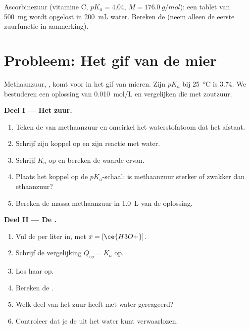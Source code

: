 \begin{exercise}[$\star\star\star$]\label{exo:g12:ka-and-pka:15}
Ascorbinezuur (vitamine C, $pK_a = 4.04$, $M = \qty{176.0}{g/mol}$): een
tablet van \qty{500}{mg} wordt opgelost in \qty{200}{mL} water. Bereken
de  (neem alleen de eerste zuurfunctie in aanmerking).
\end{exercise}

\section{Probleem: Het gif van de mier}


\begin{problem}
\label{pb:g12:ka-and-pka:1}
Methaanzuur, , komt voor in het gif van mieren. Zijn $pK_a$ bij
\qty{25}{\celsius} is 3.74. We bestuderen een oplossing van
\qty{0.010}{mol/L} en vergelijken die met zoutzuur.

\medskip
\noindent\textbf{Deel I --- Het zuur.}
\begin{enumerate}
  \item Teken de  van methaanzuur en omcirkel het
        waterstofatoom dat het afstaat.
  \item Schrijf zijn koppel op en zijn reactie met water.
  \item Schrijf $K_a$ op en bereken de waarde ervan.
  \item Plaats het koppel op de $pK_a$-schaal: is methaanzuur sterker of
        zwakker dan ethaanzuur?
  \item Bereken de massa methaanzuur in \qty{1.0}{L} van de oplossing.
\end{enumerate}

\medskip
\noindent\textbf{Deel II --- De .}
\begin{enumerate}[resume]
  \item Vul de  per liter in, met $x = [\ce{H3O+}]$.
  \item Schrijf de vergelijking $Q_{eq} = K_a$ op.
  \item Los haar op.
  \item Bereken de .
  \item Welk deel van het zuur heeft met water gereageerd?
  \item Controleer dat je de  uit het water kunt verwaarlozen.
\end{enumerate}


\end{problem}
